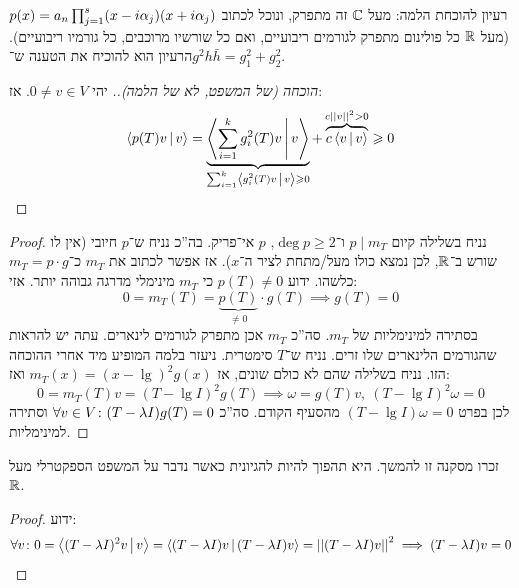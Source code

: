 \documentclass[name=רשימות אלגברה לינארית 2א]{../../../tex/classes/megasumPreamble}
\begin{document}
	רעיון להוכחת הלמה: מעל $\mathbb{C}$ זה מתפרק, ונוכל לכתוב $p(x) = a_n\prod_{j = 1}^{s} (x - i\alpha_j)(x + i\alpha_j)$ (מעל $\mathbb{R}$ כל פולינום מתפרק לגורמים ריבועיים, ואם כל שורשיו מרוכבים, כל גורמיו ריבועיים). הרעיון הוא להוכיח את הטענה ש־$g^2 h \bar h = g_1^2 + g_2^2$.
	\begin{proof}[הוכחה (של המשפט, לא של הלמה).]
		יהי $0 \neq v \in V$. אז: 
		\[ \mut{p(T)v}{v} = \underbrace{\mut{\sum_{i = 1}^{k}g_i^2(T)v}{v}}_{\mathclap{\sum_{i = 1}^{k} \mut{g_i^2(T)v}{v}\ge 0}} + \overbrace{c\mut{v}{v}}^{c\norm{v}^2 > 0} \ge 0 \]\mathenvendproof
	\end{proof}
	
	\begin{proof}
		נניח בשלילה קיום $p \mid m_T$ ו־$\deg p \ge 2$, $p $ אי־פריק. בה''כ נניח ש־$p$ חיובי (אין לו שורש ב־$\mathbb{R}$, לכן נמצא כולו מעל/מתחת לציר ה־$x$). אז אפשר לכתוב את $m_T$ כ־$m_T = p \cdot g$ כלשהו. ידוע $p(T) \neq 0$ כי $m_T$ מינימלי מדרגה גבוהה יותר. 
		אזי: 
		\[ 0 = m_T(T) = \underbrace{p(T)}_{\neq 0} \cdot g(T) \implies g(T) = 0 \]
		בסתירה למינימליות של $m_T$. סה''כ $m_T$ אכן מתפרק לגורמים לינארים. עתה יש להראות שהגורמים הלינארים שלו זרים. נניח ש־$T$ סימטרית. ניעזר בלמה המופיע מיד אחרי ההוכחה הזו. נניח בשלילה שהם לא כולם שונים, אז $m_T(x) = (x - \lg)^2g(x)$ ואז: 
		\[ 0 = m_T(T)v = (T - \lg I)^{2}g(T) \implies \omega = g(T)v, \ (T - \lg I)^2\omega = 0 \]
		לכן בפרט $(T - \lg I)\omega = 0$ מהסעיף הקודם. סה''כ $\forall v \in V \colon (T - \lambda I)g(T) = 0$ וסתירה למינימליות. 
	\end{proof}
	
	זכרו מסקנה זו להמשך. היא תהפוך להיות להגיונית כאשר נדבר על המשפט הספקטרלי מעל $\mathbb{R}$. 
	
	\begin{proof}
		ידוע: 
		\[ \forall v \colon 0 = \left \langle (T - \lambda I)^{2}v \,\middle|\, v \right \rangle = \left \langle (T - \lambda I)v \,\middle|\, (T - \lambda I)v \right \rangle = \left \vert \left \vert (T - \lambda I)v \right \vert \right \vert^2 \implies (T - \lambda I)v = 0 \]\mathenvendproof
	\end{proof}
	
\end{document}

